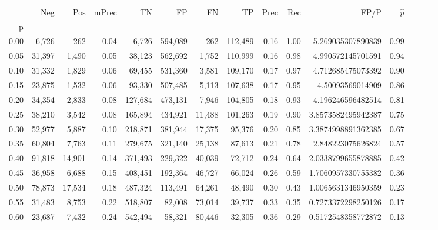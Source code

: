 \begin{tabular}{rrrrrrrrrrrrrrr}
\toprule
{} &     Neg &     Pos & mPrec &       TN &       FP &       FN &       TP &  Prec &   Rec &                  FP/P & $\hat{p}$ \\
p    &         &         &       &          &          &          &          &       &       &                       &           \\
\midrule
0.00 &   6,726 &     262 &  0.04 &    6,726 &  594,089 &      262 &  112,489 &  0.16 &  1.00 &     5.269035307890839 &      0.99 \\
0.05 &  31,397 &   1,490 &  0.05 &   38,123 &  562,692 &    1,752 &  110,999 &  0.16 &  0.98 &     4.990572145701591 &      0.94 \\
0.10 &  31,332 &   1,829 &  0.06 &   69,455 &  531,360 &    3,581 &  109,170 &  0.17 &  0.97 &     4.712685475073392 &      0.90 \\
0.15 &  23,875 &   1,532 &  0.06 &   93,330 &  507,485 &    5,113 &  107,638 &  0.17 &  0.95 &      4.50093569014909 &      0.86 \\
0.20 &  34,354 &   2,833 &  0.08 &  127,684 &  473,131 &    7,946 &  104,805 &  0.18 &  0.93 &     4.196246596482514 &      0.81 \\
0.25 &  38,210 &   3,542 &  0.08 &  165,894 &  434,921 &   11,488 &  101,263 &  0.19 &  0.90 &    3.8573582495942387 &      0.75 \\
0.30 &  52,977 &   5,887 &  0.10 &  218,871 &  381,944 &   17,375 &   95,376 &  0.20 &  0.85 &    3.3874998891362385 &      0.67 \\
0.35 &  60,804 &   7,763 &  0.11 &  279,675 &  321,140 &   25,138 &   87,613 &  0.21 &  0.78 &     2.848223075626824 &      0.57 \\
0.40 &  91,818 &  14,901 &  0.14 &  371,493 &  229,322 &   40,039 &   72,712 &  0.24 &  0.64 &    2.0338799655878885 &      0.42 \\
0.45 &  36,958 &   6,688 &  0.15 &  408,451 &  192,364 &   46,727 &   66,024 &  0.26 &  0.59 &    1.7060957330755382 &      0.36 \\
0.50 &  78,873 &  17,534 &  0.18 &  487,324 &  113,491 &   64,261 &   48,490 &  0.30 &  0.43 &    1.0065631346950359 &      0.23 \\
0.55 &  31,483 &   8,753 &  0.22 &  518,807 &   82,008 &   73,014 &   39,737 &  0.33 &  0.35 &    0.7273372298250126 &      0.17 \\
0.60 &  23,687 &   7,432 &  0.24 &  542,494 &   58,321 &   80,446 &   32,305 &  0.36 &  0.29 &    0.5172548358772872 &      0.13 \\

\end{tabular}

